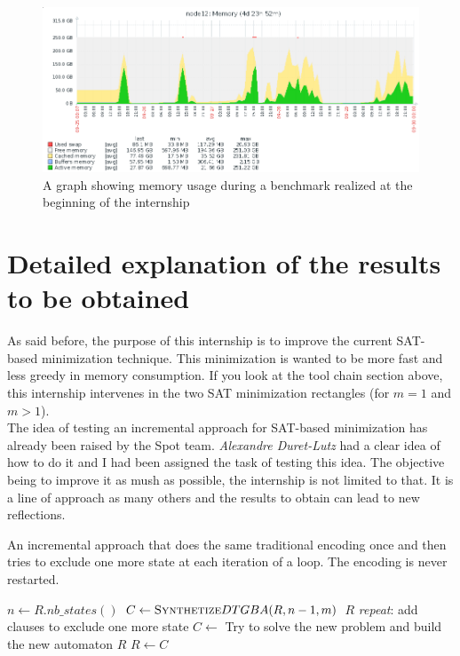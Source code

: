 \begin{figure}[h]
 \centering
 \includegraphics[scale=0.5]{img/over_memory.png}
 \caption{A graph showing memory usage during a benchmark realized at the beginning of the internship}
 \label{fig:over_memory}
\end{figure}

\section{Detailed explanation of the results to be obtained}
As said before, the purpose of this internship is to improve the current SAT-based minimization technique.
This minimization is wanted to be more fast and less greedy in memory consumption.
If you look at the tool chain section above, this internship intervenes in the two SAT minimization
rectangles (for $m=1$ and $m > 1$).\\

The idea of testing an incremental approach for SAT-based minimization has already been raised by the Spot
team. \textit{Alexandre Duret-Lutz} had a clear idea of how to do it and I had been assigned the task of
testing this idea. The objective being to improve it as mush as possible, the internship is not limited
to that. It is a line of approach as many others and the results to obtain can lead to new reflections.\\

\begin{algorithm}[H]
 \caption{An incremental approach that does the same traditional encoding once and then tries to exclude
          one more state at each iteration of a loop. The encoding is never restarted.}
 \label{incr1}
 \begin{algorithmic}[1]
   \State $n \gets R.nb\_states() $
   \State $C \gets \textsc{Synthetize}DTGBA(R,n-1,m) $
    \Return $R$\EndIf
   \BState \emph{repeat}:
   \State add clauses to exclude one more state
   \State $C \gets$ Try to solve the new problem and build the new automaton
    \Return $R$\EndIf
   \State $R \gets C$
  \EndProcedure
 \end{algorithmic}
\end{algorithm}

